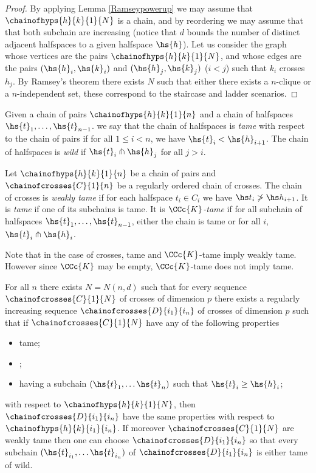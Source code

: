 \begin{proof}
	By applying Lemma \ref{Ramseypowerup} we may assume that  $\chainofhyps{h}{k}{1}{N}$ is a chain, and by reordering we may assume that that both subchain are increasing (notice that $d$ bounds the number of distinct adjacent halfspaces to a given halfspace $\hs{h}$).
	Let us consider the graph whose vertices are the pairs $\chainofhyps{h}{k}{1}{N}$, and whose edges are the pairs $(\hs{h}_i,\hs{k}_i)$ and $(\hs{h}_j,\hs{k}_j)$ ($i<j$) such that $k_i$ crosses $h_j$.
	By Ramsey's theorem there exists $N$ such that either there exists a $n$-clique or a $n$-independent set, these correspond to the staircase and ladder scenarios.
\end{proof}


	Given a chain of pairs $\chainofhyps{h}{k}{1}{n}$ and a chain of halfspaces $\hs{t}_1,\ldots,\hs{t}_{n-1}$. we say that the chain of halfspaces is \emph{tame} with respect to the chain of pairs if for all $1\leq i<n$, we have $\hs{t}_i<\hs{h}_{i+1}$. The chain of halfspaces is \emph{wild} if $\hs{t}_i \pitchfork \hs{h}_{j}$ for all $j>i$.

	Let $\chainofhyps{h}{k}{1}{n}$ be a chain of pairs  and $\chainofcrosses{C}{1}{n}$ be a regularly ordered chain of crosses. The chain of crosses is \emph{weakly tame} if for each halfspace $t_i \in C_i$ we have $\hs t_i\not > \hs h_{i+1}$. It is \emph{tame} if one of its subchains is tame. It is \emph{$\CCc{K}$-tame} if for all subchain of halfspaces  $\hs{t}_1,\ldots,\hs{t}_{n-1}$, either the chain is tame or for all $i$, $\hs{t}_i \pitchfork \hs{h}_i$.%



Note that in the case of crosses, tame and $\CCc{K}$-tame imply weakly tame. However since $\CCc{K}$ may be empty, $\CCc{K}$-tame does not imply tame.

\begin{lemma}\label{reductionforcrosses}%
	For all $n$ there exists $N=N(n,d)$ such that for every sequence  $\chainofcrosses{C}{1}{N}$ of crosses of dimension $p$ there exists a regularly increasing sequence $\chainofcrosses{D}{i_1}{i_n}$ of crosses of dimension $p$ such that if $\chainofcrosses{C}{1}{N}$ have any of the following properties
	\begin{itemize}
		\item tame;
		\item \intcs;
		\item having a subchain $(\hs{t}_1, \dots \hs{t}_n)$ such that $\hs{t}_i \geq \hs{h}_i$;
	\end{itemize}
	with respect to $\chainofhyps{h}{k}{1}{N}$, then $\chainofcrosses{D}{i_1}{i_n}$ have the same properties with respect to $\chainofhyps{h}{k}{i_1}{i_n}$.
	If moreover $\chainofcrosses{C}{1}{N}$ are weakly tame then one can choose  $\chainofcrosses{D}{i_1}{i_n}$ so that every subchain $(\hs{t}_{i_1}, \dots \hs{t}_{i_n})$ of $\chainofcrosses{D}{i_1}{i_n}$ is either tame of wild.
\end{lemma}

